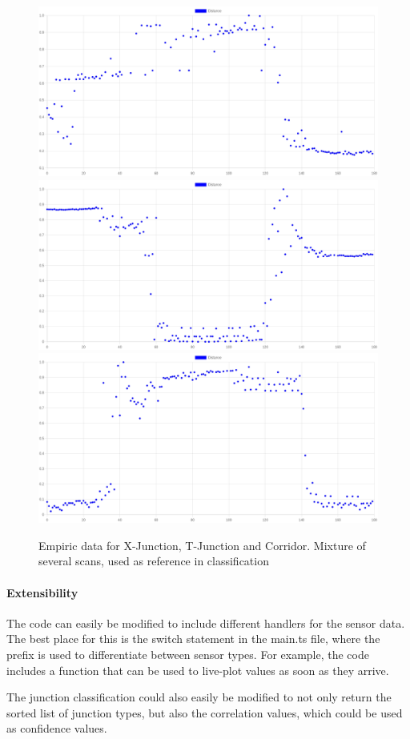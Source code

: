 \begin{figure}
    \centering
    \includegraphics[width=0.45\linewidth]{figures/x_graph_empiric.png}
    \includegraphics[width=0.45\linewidth]{figures/t_graph_empiric.png}
    \includegraphics[width=0.45\linewidth]{figures/c_graph_empiric.png}
    \caption{Empiric data for X-Junction, T-Junction and Corridor.
        Mixture of several scans, used as reference in classification}

    \label{fig:actual}
\end{figure}

\paragraph{Extensibility}
The code can easily be modified to include different handlers for the sensor data.
The best place for this is the switch statement in the main.ts file, where the prefix is used to differentiate between sensor types.
For example, the code includes a function that can be used to live-plot values as soon as they arrive.

The junction classification could also easily be modified to not only return the sorted list of junction types, but also the correlation values, which could be used as confidence values.